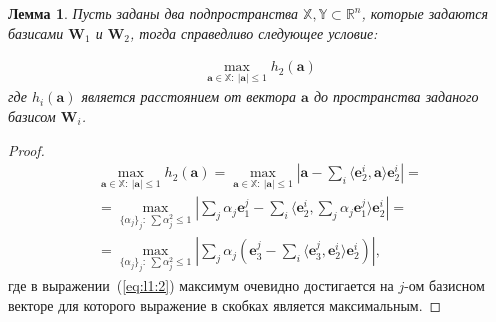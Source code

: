 \documentclass[12pt, twoside]{article}
\newtheorem{lemma}[theorem]{Лемма}
\numberwithin{equation}{section}
\begin{document}
\begin{lemma} \label{lem:1} 
Пусть заданы два подпространства $\mathbb{X}, \mathbb{Y} \subset \mathbb{R}^{n}$, которые задаются базисами $\textbf{W}_1$ и  $\textbf{W}_2$, тогда справедливо следующее условие:

\begin{equation}
\label{eq:l1:1}
\begin{aligned}
\max_{\textbf{a} \in \mathbb{X}:~\left|\textbf{a}\right|\leq 1}h_2\left(\textbf{a}\right)
\end{aligned}
\end{equation}
где $h_i\left(\textbf{a}\right)$ является расстоянием от вектора $\textbf{a}$ до пространства заданого базисом $\textbf{W}_i$.
\end{lemma}

\begin{proof}
\begin{equation}
\label{eq:l1:2}
\begin{aligned}
\max_{\textbf{a} \in \mathbb{X}:~\left|\textbf{a}\right|\leq 1}h_2\left(\textbf{a}\right) = \max_{\textbf{a} \in \mathbb{X}:~\left|\textbf{a}\right|\leq 1}\left|\textbf{a}-\sum_{i}\langle \textbf{e}^i_2, \textbf{a} \rangle\textbf{e}^i_2 \right| = \\ 
=\max_{\{\alpha_j\}_{j}:~\sum\alpha_j^2\leq 1}\left|\sum_{j}\alpha_j\textbf{e}^{j}_1-\sum_{i}\langle \textbf{e}^i_2, \sum_{j}\alpha_j\textbf{e}^{j}_1 \rangle\textbf{e}^i_2 \right| =\\
= \max_{\{\alpha_j\}_{j}:~\sum\alpha_j^2\leq 1}\left|\sum_{j}\alpha_j\left(\textbf{e}_3^j - \sum_{i}\langle\textbf{e}_3^j,\textbf{e}_2^i\rangle\textbf{e}_2^i\right)\right|,
\end{aligned}
\end{equation}
где в выражении~(\ref{eq:l1:2}) максимум очевидно достигается на $j$-ом базисном векторе для которого выражение в скобках является максимальным.
\end{proof}
\end{document}
